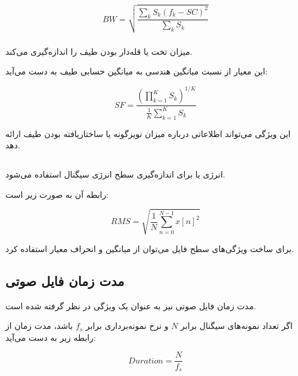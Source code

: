 \documentclass[12pt,a4paper,oneside]{report}
\begin{document}
\begin{equation}
BW
=
\sqrt{
\frac{
\sum_k
S_k(f_k-SC)^2
}{
\sum_kS_k
}
}
\end{equation}


\subsubsection{}

میزان تخت یا قله‌دار بودن طیف را اندازه‌گیری می‌کند.

این معیار از نسبت میانگین هندسی به میانگین حسابی طیف به دست می‌آید:

\begin{equation}
SF
=
\frac{
\left(
\prod_{k=1}^{K}S_k
\right)^{1/K}
}{
\frac{1}{K}
\sum_{k=1}^{K}S_k
}
\end{equation}

این ویژگی می‌تواند اطلاعاتی درباره میزان نویزگونه یا ساختاریافته بودن طیف ارائه دهد.


\subsection{}

انرژی
یا
برای اندازه‌گیری سطح انرژی سیگنال استفاده می‌شود.

رابطه آن به صورت زیر است:

\begin{equation}
RMS
=
\sqrt{
\frac{1}{N}
\sum_{n=0}^{N-1}
x[n]^2
}
\end{equation}

برای ساخت ویژگی‌های سطح فایل می‌توان از میانگین و انحراف معیار
استفاده کرد.


\subsection{مدت زمان فایل صوتی}

مدت زمان فایل صوتی نیز به عنوان یک ویژگی در نظر گرفته شده است.

اگر تعداد نمونه‌های سیگنال برابر $N$ و نرخ نمونه‌برداری برابر $f_s$ باشد، مدت زمان از رابطه زیر به دست می‌آید:

\begin{equation}
Duration
=
\frac{N}{f_s}
\end{equation}
\end{document}

